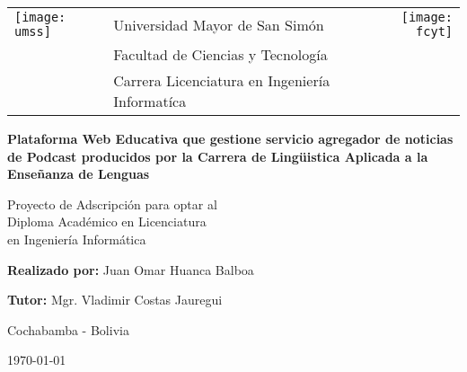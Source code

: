 

\begin{titlepage}
	
	\begin{tabular}[t]{l p{9cm} r}

		\texttt{[image: umss]}	& \centering \large{Universidad Mayor de San Sim\'{o}n} &	\texttt{[image: fcyt]} 	\\
		 									& \centering \large{Facultad de Ciencias y Tecnolog\'{i}a} &	\\
											& \centering \large{Carrera Licenciatura en Ingenier\'{i}a Informat\'{i}ca} &	\\
	\end{tabular}
	
	
	\begin{center}
		\normalsize
		
		\vspace{1.5cm}
		\Large{
		\textbf{Plataforma Web Educativa que gestione servicio agregador de noticias de Podcast producidos por la Carrera de Ling\"{u}istica Aplicada a la Enseñanza de Lenguas} 
		}		\\
	
		\vspace{1.5cm}
	
		\small
	\end{center}
		
	\begin{flushright}
	
		Proyecto de Adscripci\'{o}n para optar al \\ 
		Diploma Acad\'{e}mico en Licenciatura \\ 
		en Ingenier\'{i}a Inform\'{a}tica	
		
	\end{flushright}
	
	\begin{center}
		
		\vspace{1.5cm}
			
		\textbf{Realizado por:} Juan Omar Huanca Balboa \\
	
		\vspace{1.5cm}
	
		\textbf{Tutor:} Mgr. Vladimir Costas Jauregui \\
		
		\vspace{1.5cm}
		
		Cochabamba - Bolivia
	
		\vspace{1.5cm}
		
			
		\monthyeardate\today
		
	\end{center}			

\end{titlepage}